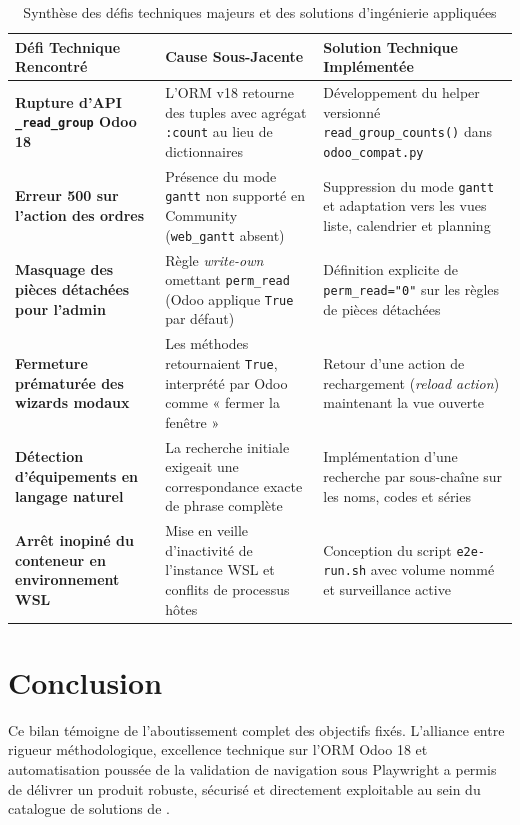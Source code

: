 \begin{table}[!ht]
\centering
\small
\renewcommand{\arraystretch}{1.18}
\begin{tabularx}{\textwidth}{p{4.0cm} p{4.5cm} X}
\toprule
\textbf{Défi Technique Rencontré} & \textbf{Cause Sous-Jacente} & \textbf{Solution Technique Implémentée} \\
\midrule
\textbf{Rupture d'API \texttt{\_read\_group} Odoo 18} & L'ORM v18 retourne des tuples avec agrégat \texttt{:count} au lieu de dictionnaires & Développement du helper versionné \texttt{read\_group\_counts()} dans \texttt{odoo\_compat.py} \\
\midrule
\textbf{Erreur 500 sur l'action des ordres} & Présence du mode \texttt{gantt} non supporté en Community (\texttt{web\_gantt} absent) & Suppression du mode \texttt{gantt} et adaptation vers les vues liste, calendrier et planning \\
\midrule
\textbf{Masquage des pièces détachées pour l'admin} & Règle \textit{write-own} omettant \texttt{perm\_read} (Odoo applique \texttt{True} par défaut) & Définition explicite de \texttt{perm\_read="0"} sur les règles de pièces détachées \\
\midrule
\textbf{Fermeture prématurée des wizards modaux} & Les méthodes retournaient \texttt{True}, interprété par Odoo comme « fermer la fenêtre » & Retour d'une action de rechargement (\textit{reload action}) maintenant la vue ouverte \\
\midrule
\textbf{Détection d'équipements en langage naturel} & La recherche initiale exigeait une correspondance exacte de phrase complète & Implémentation d'une recherche par sous-chaîne sur les noms, codes et séries \\
\midrule
\textbf{Arrêt inopiné du conteneur en environnement WSL} & Mise en veille d'inactivité de l'instance WSL et conflits de processus hôtes & Conception du script \texttt{e2e-run.sh} avec volume nommé et surveillance active \\
\bottomrule
\end{tabularx}
\caption{Synthèse des défis techniques majeurs et des solutions d'ingénierie appliquées}
\label{tab:challenges_solutions}
\end{table}

\section{Conclusion}
Ce bilan témoigne de l'aboutissement complet des objectifs fixés. L'alliance entre rigueur méthodologique, excellence technique sur l'ORM Odoo 18 et automatisation poussée de la validation de navigation sous Playwright a permis de délivrer un produit robuste, sécurisé et directement exploitable au sein du catalogue de solutions de \textbf{\companyName}.
